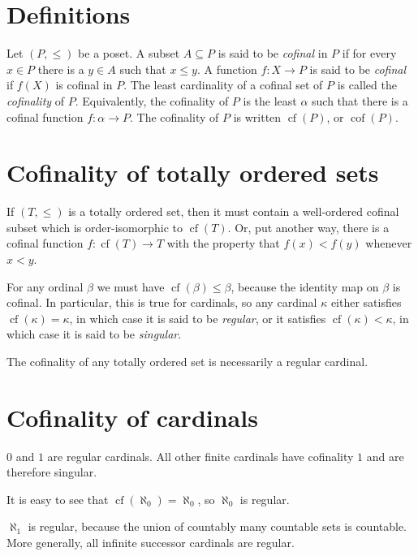 \documentclass{article}
\def\cf#1{\operatorname{cf}(#1)}
\def\cof#1{\operatorname{cof}(#1)}
\begin{document}

\section*{Definitions}

Let $(P,\leq)$ be a poset. A subset $A\subseteq P$ is said to be \emph{cofinal} in $P$ if for every $x\in P$ there is a $y\in A$ such that $x\le y$.
A function $f\colon X\to P$ is said to be \emph{cofinal} if $f(X)$ is cofinal in $P$.
The least cardinality of a cofinal set of $P$ is called the \emph{cofinality} of $P$.
Equivalently, the cofinality of $P$ is the least  $\alpha$ such that there is a cofinal function $f\colon\alpha\to P$.
The cofinality of $P$ is written $\cf{P}$, or $\cof{P}$.

\section*{Cofinality of totally ordered sets}

If $(T,\leq)$ is a totally ordered set, then it must contain a well-ordered cofinal subset which is order-isomorphic to $\cf{T}$.
Or, put another way, there is a cofinal function $f\colon\cf{T}\to T$ with the property that $f(x)<f(y)$ whenever $x<y$.

For any ordinal $\beta$ we must have $\cf{\beta}\leq\beta$, because the identity map on $\beta$ is cofinal.
In particular, this is true for cardinals, so any cardinal $\kappa$ either satisfies $\cf{\kappa}=\kappa$, in which case it is said to be \emph{regular}, or it satisfies $\cf{\kappa}<\kappa$, in which case it is said to be \emph{singular}.

The cofinality of any totally ordered set is necessarily a regular cardinal.

\section*{Cofinality of cardinals}

$0$ and $1$ are regular cardinals. All other finite cardinals have cofinality $1$ and are therefore singular.

It is easy to see that $\cf{\aleph_0}=\aleph_0$, so $\aleph_0$ is regular.

$\aleph_1$ is regular, because the union of countably many countable sets is countable.
More generally, all infinite successor cardinals are regular.
\end{document}
